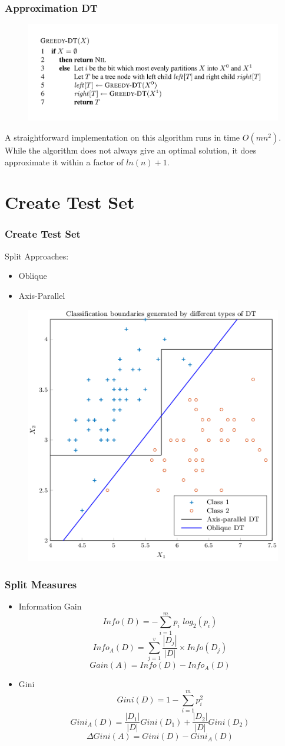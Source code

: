 \documentclass{beamer}
\begin{document}
\begin{frame}
	\frametitle{Approximation DT}
	\begin{figure}
		\includegraphics[width=0.9\linewidth]{Pics/greedy.png}
	\end{figure}
	
	A straightforward implementation on this algorithm runs in time $O(mn^2)$. While the algorithm does not
	always give an optimal solution, it does approximate it within a factor of $ln(n) + 1$.
\end{frame}

\section{Create Test Set}
\begin{frame}
	\frametitle{Create Test Set}
	Split Approaches:
	\begin{itemize}
		\item
		Oblique
		\item
		Axis-Parallel \checkmark
	\end{itemize}
	\begin{figure}
		\includegraphics[width=0.5\linewidth]{Pics/oblique.png}
	\end{figure}
\end{frame}

\begin{frame}
	\frametitle{Split Measures}
	\begin{itemize}
		\item Information Gain
		\[Info(D)=-\sum_{i=1}^{m} p_i\hspace{4pt} log_2 (p_i)\]
		\[Info_A(D)= \sum_{j=1}^{v} \frac{|D_j|}{|D|}\times Info(D_j)\]
		\[Gain(A) = Info(D) - Info_A(D) \]
		
		\item Gini\\
		\[Gini(D) = 1- \sum_{i=1}^{m} p_i^2\]
		\[Gini_A(D) = \frac{|D_1|}{|D|}Gini(D_1) + \frac{|D_2|}{|D|}Gini(D_2)\]
		\[\Delta Gini(A) = Gini(D) - Gini_A(D)\]
	\end{itemize}
\end{frame}
\end{document}
